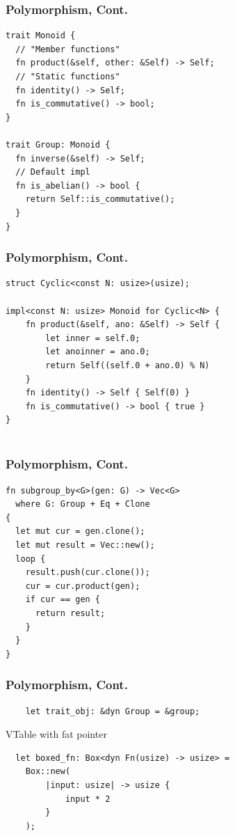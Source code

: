 \documentclass[UTF-8]{ctexbeamer}
\begin{document}
\begin{frame}[fragile]
  \frametitle{Polymorphism, Cont.}
  \begin{verbatim}
trait Monoid {
  // "Member functions"
  fn product(&self, other: &Self) -> Self;
  // "Static functions"
  fn identity() -> Self;
  fn is_commutative() -> bool;
}

trait Group: Monoid {
  fn inverse(&self) -> Self;
  // Default impl
  fn is_abelian() -> bool {
    return Self::is_commutative();
  }
}
  \end{verbatim}
\end{frame}

\begin{frame}[fragile]
  \frametitle{Polymorphism, Cont.}

  \begin{verbatim}
struct Cyclic<const N: usize>(usize);

impl<const N: usize> Monoid for Cyclic<N> {
    fn product(&self, ano: &Self) -> Self {
        let inner = self.0;
        let anoinner = ano.0;
        return Self((self.0 + ano.0) % N)
    }
    fn identity() -> Self { Self(0) }
    fn is_commutative() -> bool { true }
}
    
  \end{verbatim}

  

\end{frame}

\begin{frame}[fragile]
  \frametitle{Polymorphism, Cont.}

  \begin{verbatim}
fn subgroup_by<G>(gen: G) -> Vec<G>
  where G: Group + Eq + Clone
{
  let mut cur = gen.clone();
  let mut result = Vec::new();
  loop {
    result.push(cur.clone());
    cur = cur.product(gen);
    if cur == gen {
      return result;
    }
  }
}
  \end{verbatim}
\end{frame}

\begin{frame}[fragile]
  \frametitle{Polymorphism, Cont.}

  \begin{verbatim}
    let trait_obj: &dyn Group = &group;
  \end{verbatim}

  \pause
  \vspace{1em}

  VTable with fat pointer

  \pause
  \vspace{1em}
  
  \pause
  \begin{verbatim}
  let boxed_fn: Box<dyn Fn(usize) -> usize> =
    Box::new(
        |input: usize| -> usize {
            input * 2
        }
    );
  \end{verbatim}
\end{frame}
\end{document}
